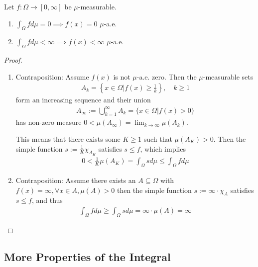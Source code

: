 \begin{prop}
  Let $f: \Omega \to [0,\infty]$ be $\mu$-measurable.
  \begin{enumerate}
    \item $\int_{\Omega} f d \mu = 0 \implies f(x) = 0$ $\mu$-a.e.
    \item $\int_{\Omega} f d \mu < \infty \implies f(x) < \infty$ $\mu$-a.e.
  \end{enumerate}
\end{prop}
\begin{proof}
\begin{enumerate}
  \item Contraposition: Assume $f(x)$ is not $\mu$-a.e. zero. Then the $\mu$-measurable sets
    \begin{align*}
      A_k = \left\{x \in \Omega \big\vert f(x) \geq \frac{1}{k}\right\}, \quad k \geq 1
    \end{align*}
    form an increasing sequence and their union
    \begin{align*}
      A_{\infty} := \bigcup_{k=1}^{\infty} A_k = \{x \in \Omega \big\vert f(x) > 0\}
    \end{align*}
    has non-zero measure $0 < \mu(A_{\infty}) = \lim_{k \to \infty} \mu(A_k)$.

    This means that there exists some $K \geq 1$ such that $\mu(A_K) > 0$.
    Then the simple function 
    $s := \frac{1}{K} \chi_{A_K}$
    satisfies $s \leq f$, which implies
    \begin{align*}
      0 < \frac{1}{K} \mu(A_K) = \int_{\Omega} s d \mu \leq \int_{\Omega} f d \mu
    \end{align*}
  \item Contraposition: Assume there exists an $A \subseteq \Omega$ with
    $f(x) = \infty, \forall x \in A, \mu(A) > 0$
    then the simple function
    $s := \infty \cdot \chi_{A}$ satisfies $s \leq f$, and thus
    \begin{align*}
      \int_{\Omega} f d \mu \geq \int_{\Omega} s d \mu = \infty \cdot \mu(A) = \infty
    \end{align*}
\end{enumerate}
\end{proof}

\subsection{More Properties of the Integral}


